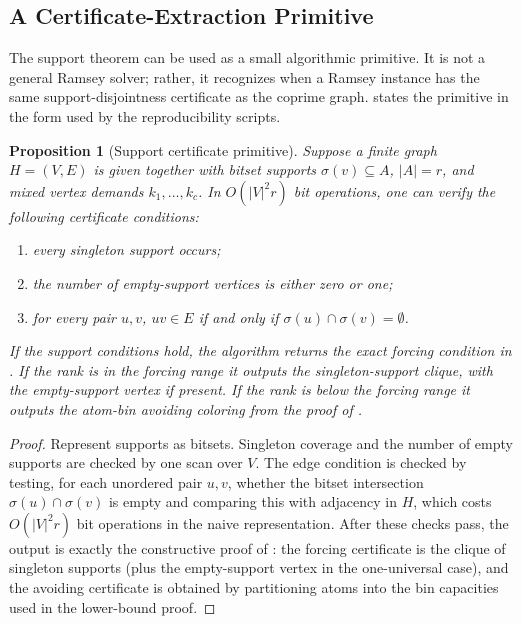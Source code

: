 \documentclass[11pt]{article}
\theoremstyle{plain}
\newtheorem{proposition}[theorem]{Proposition}
\theoremstyle{definition}
\theoremstyle{remark}
\begin{document}
\subsection{A Certificate-Extraction Primitive}
\label{subsec:certificate-primitive}

The support theorem can be used as a small algorithmic primitive.  It is not
a general Ramsey solver; rather, it recognizes when a Ramsey instance has the
same support-disjointness certificate as the coprime graph.
 states the primitive in the form used by
the reproducibility scripts.

\begin{proposition}[Support certificate primitive]
\label{prop:certificate-primitive}
Suppose a finite graph $H=(V,E)$ is given together with bitset supports
$\sigma(v)\subseteq A$, $|A|=r$, and mixed vertex demands
$k_1,\ldots,k_c$.  In $O(|V|^2r)$ bit operations, one can verify the following
certificate conditions:
\begin{enumerate}
  \item every singleton support occurs;
  \item the number of empty-support vertices is either zero or one;
  \item for every pair $u,v$, $uv\in E$ if and only if
  $\sigma(u)\cap\sigma(v)=\emptyset$.
\end{enumerate}
If the support conditions hold, the algorithm returns the exact forcing
condition in .  If the rank is in the forcing range it
outputs the singleton-support clique, with the empty-support vertex if
present.  If the rank is below the forcing range it outputs the atom-bin
avoiding coloring from the proof of .
\end{proposition}

\begin{proof}
Represent supports as bitsets.  Singleton coverage and the number of empty
supports are checked by one scan over $V$.  The edge condition is checked by
testing, for each unordered pair $u,v$, whether the bitset intersection
$\sigma(u)\cap\sigma(v)$ is empty and comparing this with adjacency in
$H$, which costs $O(|V|^2r)$ bit operations in the naive representation.
After these checks pass, the output is exactly the constructive proof of
: the forcing certificate is the clique of singleton
supports (plus the empty-support vertex in the one-universal case), and the
avoiding certificate is obtained by partitioning atoms into the bin
capacities used in the lower-bound proof.
\end{proof}
\end{document}
